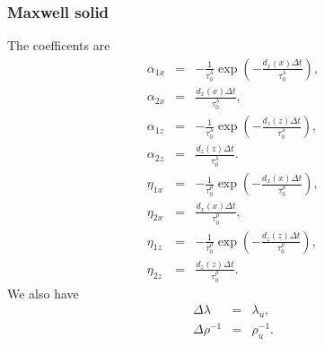 \documentclass[11pt]{article}
\begin{document}
\subsubsection*{Maxwell solid}
The coefficents are
\begin{eqnarray}
  \alpha_{1x} & = & -\frac{1}{\tau^{\lambda}_0}\exp\left(-\frac{d_x(x)\Delta t}
                          {\tau^{\lambda}_0}\right),              \\
  \alpha_{2x} & = & \frac{d_x(x)\Delta t}
                  {\tau^{\lambda}_0},                             \\
  \alpha_{1z} & = & -\frac{1}{\tau^{\lambda}_0}\exp\left(-\frac{d_z(z)\Delta t}
                  {\tau^{\lambda}_0}\right),                      \\
  \alpha_{2z}  & = & \frac{d_z(z)\Delta t}
                  {\tau^{\lambda}_0}.                             \\
  \eta_{1x} & = & -\frac{1}{\tau^{\rho}_0}\exp\left(-\frac{d_x(x)\Delta t}
                          {\tau^{\rho}_0}\right),                 \\
  \eta_{2x} & = & \frac{d_x(x)\Delta t}
                  {\tau^{\rho}_0},                                \\
  \eta_{1z} & = & -\frac{1}{\tau^{\rho}_0}\exp\left(-\frac{d_z(z)\Delta t}
                  {\tau^{\rho}_0}\right),                         \\
  \eta_{2z}  & = & \frac{d_z(z)\Delta t}
                  {\tau^{\rho}_0}.                                
\end{eqnarray}
We also have
\begin{eqnarray}
  \Delta \lambda 
    & = & \lambda_u,                  \\
  \Delta \rho^{-1} 
    & = & \rho^{-1}_u.
\end{eqnarray}
\end{document}

